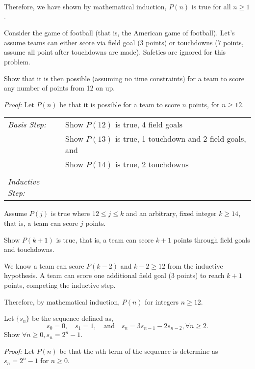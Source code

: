 \documentclass[10pt,addpoints]{exam}
\begin{document}
\begin{questions}
\begin{solution}
	\smallskip
	Therefore, we have shown by mathematical induction, $P(n)$ is true for all $n \geq 1$.
\end{solution}


\question[14] Consider the game of football (that is, the American game of football).  Let's assume teams can either score via field goal (3 points) or touchdowns (7 points, assume all point after touchdowns are made).   Safeties are ignored for this problem.  

Show that it is then possible (assuming no time constraints) for a team to score any number of points from 12 on up. 
    \ifprintanswers
        \vspace{-10pt}
   \fi
\begin{solution}
	\textit{Proof:}
	Let $P(n)$ be that it is possible for a team to score $n$ points, for $n \geq 12$.
	
	\smallskip
	\begin{tabular}{lp{4in}}
	  \textit{Basis Step:} 	& Show $P(12)$ is true, 4 field goals \\
	  						& Show $P(13)$ is true, 1 touchdown and 2 field goals, and \\
	  						& Show $P(14)$ is true, 2 touchdowns \\
	   & \\
	 \textit{Inductive Step:} &  \\
	\end{tabular}

	Assume $P(j)$ is true where $12 \leq j \leq k$ and an arbitrary, fixed integer $k \geq 14$, that is, a team can score $j$ points. 

	Show $P(k+1)$ is true, that is, a team can score $k+1$ points through field goals and touchdowns.

	We know a team can score $P(k-2)$ and $k -2 \geq 12$ from the inductive hypothesis. A team can score one additional field goal (3 points) to reach $k+1$ points, competing the inductive step. 

	Therefore, by mathematical induction, $P(n)$ for integers $n \geq 12$. 
\end{solution}



\question[14] Let $\{s_n\}$ be the sequence defined as, 
\[ s_0 = 0, \quad s_1 = 1,  \quad \text{and} \quad s_n = 3s_{n-1} - 2s_{n-2}, \forall n \geq 2. \]
Show $\forall n \geq 0, s_n = 2^n - 1 .$
    \ifprintanswers
        \vspace{-10pt}
   \fi
\begin{solution}
	\textit{Proof:}
	Let $P(n)$ be that the $n$th term of the sequence is determine as $s_n = 2^n - 1$ for $n \geq 0$.


\end{solution}
\end{questions}
\end{document}
